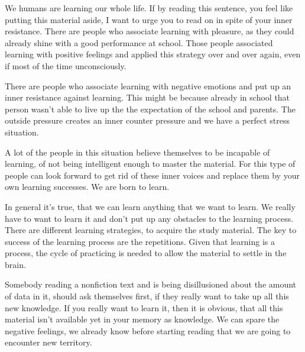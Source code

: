 \documentclass[../main.tex]{subfiles}
\begin{document}
We humans are learning our whole life. If by reading this sentence, you feel like putting this material aside, I want to urge you to read on in spite of your inner resistance.
There are people who associate learning with pleasure, as they could already shine with a good performance at school.
Those people associated learning with positive feelings and applied this strategy over and over again, even if most of the time unconsciously.

There are people who associate learning with negative emotions and put up an inner resistance against learning.
This might be because already in school that person wasn't able to live up the the expectation of the school and parents.
The outside pressure creates an inner counter pressure and we have a perfect stress situation.

A lot of the people in this situation believe themselves to be incapable of learning, of not being intelligent enough to master the material. For this type of people can look forward to get rid of these inner voices and replace them by your own learning successes. We are born to learn.

In general it's true, that we can learn anything that we want to learn. We really have to want to learn it and don't put up any obstacles to the learning process.
There are different learning strategies, to acquire the study material. The key to success of the learning process are the repetitions. Given that learning is a process, the cycle of practicing is needed to allow the material to settle in the brain.

Somebody reading a nonfiction text and is being disillusioned about the amount of data in it, should ask themselves first, if they really want to take up all this new knowledge. If you really want to learn it, then it is obvious, that all this material isn't available yet in your memory as knowledge.
We can spare the negative feelings, we already know before starting reading that we are going to encounter new territory.
\end{document}
